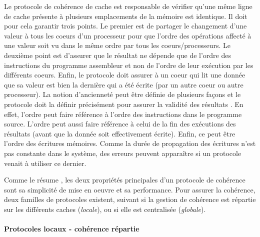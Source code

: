 Le protocole de cohérence de cache est responsable de vérifier qu'une même ligne de cache présente à plusieurs emplacements de la mémoire est identique. Il doit pour cela garantir trois points. Le premier est de partager le changement d'une valeur à tous les coeurs d'un processeur pour que l'ordre des opérations affecté à une valeur soit vu dans le même ordre par tous les coeurs/processeurs. Le deuxième point est d'assurer que le résultat ne dépende que de l'ordre des instructions du programme assembleur et non de l'ordre de leur exécution par les différents coeurs. Enfin, le protocole doit assurer à un coeur qui lit une donnée que sa valeur est bien la dernière qui a été écrite (par un autre coeur ou autre processeur). La notion d'ancienneté peut être définie de plusieurs façons et le protocole doit la définir précisément pour assurer la validité des résultats \cite{Blanchet2013}. En effet, l'ordre peut faire référence à l'ordre des instructions dans le programme source. L'ordre peut aussi faire référence à celui de la fin des exécutions des résultats (avant que la donnée soit effectivement écrite). Enfin, ce peut être l'ordre des écritures mémoires. Comme la durée de propagation des écritures n'est pas constante dans le système, des erreurs peuvent apparaître si un protocole venait à utiliser ce dernier.

Comme le résume \cite{Blanchet2013}, les deux propriétés principales d'un protocole de cohérence sont sa simplicité de mise en oeuvre et sa performance. Pour assurer la cohérence, deux familles de protocoles existent, suivant si la gestion de cohérence est répartie sur les différents caches (\textit{locale}), ou si elle est centralisée (\textit{globale}). 


\paragraph{Protocoles locaux - cohérence répartie}


